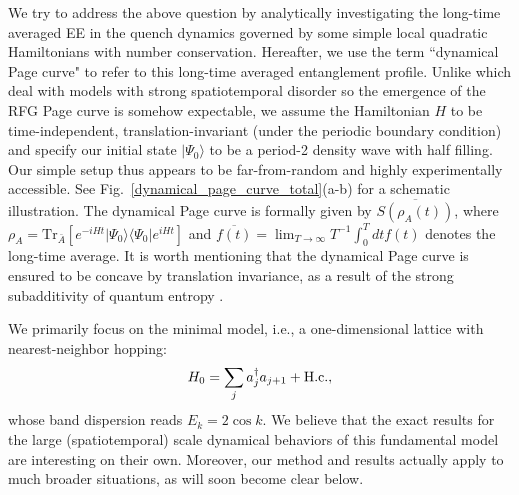 \documentclass[twocolumn,english,prl,aps,superscriptaddress,amsmath,amssymb,floatfix]{revtex4-2}
\def \Tr {\mathrm{Tr}}
\begin{document}
We try to address the above question by %
analytically investigating the long-time averaged EE in the quench dynamics governed by %
some simple local quadratic Hamiltonians with number conservation. Hereafter, we use the term ``dynamical Page curve" to refer to this long-time averaged entanglement profile. 
Unlike \citep{PhysRevE.104.014146, Dias2021} which deal with models with strong spatiotemporal disorder so the emergence of the RFG Page curve is somehow expectable, we assume the Hamiltonian $H$ to be time-independent, translation-invariant (under the periodic boundary condition) and specify our initial state $|\Psi_0\rangle$ to be %
a period-2 density wave with half filling. Our simple setup thus appears to be far-from-random and highly experimentally accessible. See Fig.~\ref{dynamical_page_curve_total}(a-b) for a schematic illustration. The dynamical Page curve is %
formally given by $\overline{S(\rho_A(t))}$, where $\rho_A=\Tr_{\bar A}[e^{-iHt}|\Psi_0\rangle\langle\Psi_0|e^{iHt}]$ and $\overline{f(t)}=\lim_{T\to\infty}T^{-1}\int^T_0 dt f(t)$ denotes the long-time average. It is worth mentioning that the dynamical Page curve is ensured to be concave by translation invariance, as a result of the strong subadditivity of quantum entropy \cite{Wolf2008}. %

We primarily focus on the minimal %
model, i.e., a one-dimensional lattice with nearest-neighbor hopping:
\begin{equation}
H_{0}=\sum_{j}a_{j}^{\dagger}a_{j+1}+{\rm H.c.},
\label{eq:NNH_Hamiltonian}
\end{equation}
whose %
band dispersion reads $E_k=2\cos k$. We believe that the exact results for the large (spatiotemporal) scale dynamical behaviors of this fundamental model are interesting on their own.  Moreover, our method and results actually apply to much broader situations, as will soon become clear below. %
\end{document}
